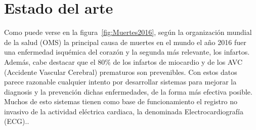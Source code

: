 
\minitoc

%
%
%
%

\section{Estado del arte}

Como puede verse en la figura~\ref{fig:Muertes2016}, según la organización mundial de la salud (OMS) la principal causa de muertes en el mundo el año 2016 fuer una enfermedad isquémica del corazón y la segunda más relevante, los infartos. Además, cabe destacar que el 80\% de los infartos de miocardio y de los AVC (Accidente Vascular Cerebral) prematuros son prevenibles. Con estos datos parece razonable cualquier intento por desarrollar sistemas para mejorar la diagnosis y la prevención dichas enfermedades, de la forma más efectiva posible. Muchos de esto sistemas tienen como base de funcionamiento el registro no invasivo de la actividad eléctrica cardiaca, la denominada Electrocardiografía (ECG).. 

